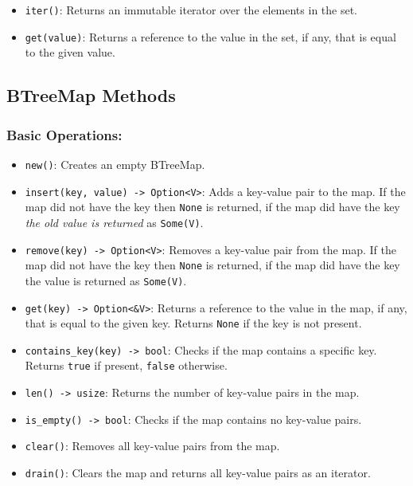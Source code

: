 \documentclass[
  11pt,
]{article}
\providecommand{\tightlist}{%
  \setlength{\itemsep}{0pt}\setlength{\parskip}{0pt}}
\begin{document}
\begin{itemize}
\tightlist
\item
  \texttt{iter()}: Returns an immutable iterator over the elements in
  the set.
\item
  \texttt{get(value)}: Returns a reference to the value in the set, if
  any, that is equal to the given value.
\end{itemize}

\subsection{BTreeMap Methods}\label{btreemap-methods}

\subsubsection{Basic Operations:}\label{basic-operations-2}

\begin{itemize}
\tightlist
\item
  \texttt{new()}: Creates an empty BTreeMap.
\item
  \texttt{insert(key,\ value)\ -\textgreater{}\ Option\textless{}V\textgreater{}}:
  Adds a key-value pair to the map. If the map did not have the key then
  \texttt{None} is returned, if the map did have the key \emph{the old
  value is returned} as \texttt{Some(V)}.
\item
  \texttt{remove(key)\ -\textgreater{}\ Option\textless{}V\textgreater{}}:
  Removes a key-value pair from the map. If the map did not have the key
  then \texttt{None} is returned, if the map did have the key the value
  is returned as \texttt{Some(V)}.
\item
  \texttt{get(key)\ -\textgreater{}\ Option\textless{}\&V\textgreater{}}:
  Returns a reference to the value in the map, if any, that is equal to
  the given key. Returns \texttt{None} if the key is not present.
\item
  \texttt{contains\_key(key)\ -\textgreater{}\ bool}: Checks if the map
  contains a specific key. Returns \texttt{true} if present,
  \texttt{false} otherwise.
\item
  \texttt{len()\ -\textgreater{}\ usize}: Returns the number of
  key-value pairs in the map.
\item
  \texttt{is\_empty()\ -\textgreater{}\ bool}: Checks if the map
  contains no key-value pairs.
\item
  \texttt{clear()}: Removes all key-value pairs from the map.
\item
  \texttt{drain()}: Clears the map and returns all key-value pairs as an
  iterator.
\end{itemize}
\end{document}
